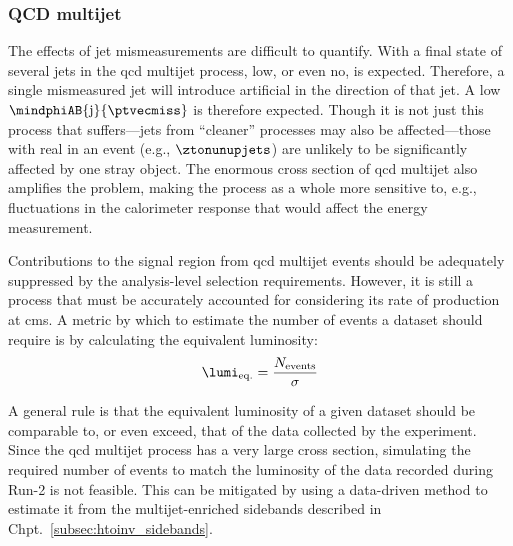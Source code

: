 



\subsubsection{\texorpdfstring{\ztonunupjets}{Z to nunu + jets}}
\label{subsubsec:htoinv_znunu_bkg}




\subsubsection{QCD multijet}
\label{subsubsec:htoinv_qcd_multijet_bkg}

The effects of \gls{jet} mismeasurements are difficult to quantify. With a final state of several \glspl{jet} in the \acrshort{qcd} multijet process, low, or even no, \ptvecmiss is expected. Therefore, a single mismeasured \gls{jet} will introduce artificial \ptvecmiss in the direction of that jet. A low $\mindphiAB{\mathrm{j}}{\ptvecmiss}$ is therefore expected. Though it is not just this process that suffers---\glspl{jet} from ``cleaner'' processes may also be affected---those with real \ptmiss in an event (e.g., $\ztonunupjets$) are unlikely to be significantly affected by one stray object. The enormous cross section of \acrshort{qcd} multijet also amplifies the problem, making the process as a whole more sensitive to, e.g., fluctuations in the calorimeter response that would affect the energy measurement.

Contributions to the signal region from \acrshort{qcd} multijet events should be adequately suppressed by the analysis-level selection requirements. However, it is still a process that must be accurately accounted for considering its rate of production at \acrshort{cms}. A metric by which to estimate the number of events a dataset should require is by calculating the equivalent luminosity:
\begin{equation}
    \lumi_{\mathrm{eq.}} = \frac{N_{\mathrm{events}}}{\sigma}
    \label{eq:equivalent_lumi}
\end{equation}

A general rule is that the equivalent luminosity of a given dataset should be comparable to, or even exceed, that of the data collected by the experiment. Since the \acrshort{qcd} multijet process has a very large cross section, simulating the required number of events to match the luminosity of the data recorded during Run-2 is not feasible. This can be mitigated by using a data-driven method to estimate it from the multijet-enriched sidebands described in Chpt.~\ref{subsec:htoinv_sidebands}.

